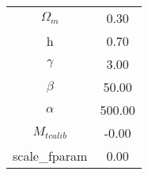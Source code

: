 \begin{table}\centering\begin{tabular}{cc}
$\Omega_m$ & 0.30 \\
h & 0.70 \\
$\gamma$ & 3.00 \\
$\beta$ & 50.00 \\
$\alpha$ & 500.00 \\
$M_{tcalib}$ & -0.00 \\
scale_{fparam} & 0.00 \\
\end{tabular}\end{table}